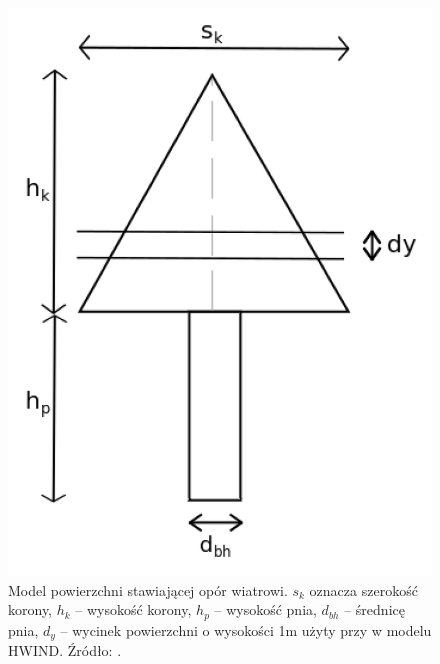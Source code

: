 \documentclass[a4paper,12pt]{article}
\begin{document}
\begin{figure}[!h]
	\center
	\includegraphics[scale=0.35]{HWIND2}
	\caption{Model powierzchni stawiającej opór wiatrowi. $s_k$ oznacza szerokość korony, $h_k$ -- wysokość korony, $h_p$ -- wysokość pnia, $d_{bh}$ -- średnicę pnia, $d_y$ -- wycinek powierzchni o wysokości 1m użyty przy w modelu HWIND. Źródło: \cite{chm_mgza}.}
	\label{fig:HWIND2}
\end{figure} 








\clearpage
{}

\end{document}
